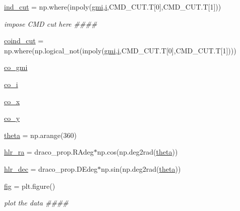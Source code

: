 \begin{DoxyCompactItemize}
\item 
\hyperlink{namespaceplot__Draco__SDSS__CMD__CMcut_af4ccb21831ab318676a2828b7225c1ca}{ind\+\_\+cut} = np.\+where(inpoly(\hyperlink{namespaceplot__Draco__SDSS__CMD__CMcut_a17ecc3c497056424be4f2c1d0fa8a178}{gmi},\hyperlink{namespaceplot__Draco__SDSS__CMD__CMcut_a6d4ac228accda712923ca1b9740c0407}{i},C\+M\+D\+\_\+\+C\+U\+T.\+T\mbox{[}0\mbox{]},C\+M\+D\+\_\+\+C\+U\+T.\+T\mbox{[}1\mbox{]}))
\begin{DoxyCompactList}\small\item\em impose C\+MD cut here \#\#\#\# \end{DoxyCompactList}\item 
\hyperlink{namespaceplot__Draco__SDSS__CMD__CMcut_a08f549437461f522191d2b4d0ea7659f}{coind\+\_\+cut} = np.\+where(np.\+logical\+\_\+not(inpoly(\hyperlink{namespaceplot__Draco__SDSS__CMD__CMcut_a17ecc3c497056424be4f2c1d0fa8a178}{gmi},\hyperlink{namespaceplot__Draco__SDSS__CMD__CMcut_a6d4ac228accda712923ca1b9740c0407}{i},C\+M\+D\+\_\+\+C\+U\+T.\+T\mbox{[}0\mbox{]},C\+M\+D\+\_\+\+C\+U\+T.\+T\mbox{[}1\mbox{]})))
\item 
\hyperlink{namespaceplot__Draco__SDSS__CMD__CMcut_a05465129dacea1fc4a6fedad4b0f0029}{co\+\_\+gmi}
\item 
\hyperlink{namespaceplot__Draco__SDSS__CMD__CMcut_a39d8d2ada3a2e98c5985f134fe54c6ec}{co\+\_\+i}
\item 
\hyperlink{namespaceplot__Draco__SDSS__CMD__CMcut_a4263c5309afa7bc424d494a8f68d69f7}{co\+\_\+x}
\item 
\hyperlink{namespaceplot__Draco__SDSS__CMD__CMcut_a65f19aa6538c710b3afe5b0fe1c4d5df}{co\+\_\+y}
\item 
\hyperlink{namespaceplot__Draco__SDSS__CMD__CMcut_a2e04bc162202f101d86aa8c604ec34c1}{theta} = np.\+arange(360)
\item 
\hyperlink{namespaceplot__Draco__SDSS__CMD__CMcut_a9b33fbee10f744052adb68e2f3bc584e}{hlr\+\_\+ra} = draco\+\_\+prop.\+R\+Adeg$\ast$np.\+cos(np.\+deg2rad(\hyperlink{namespaceplot__Draco__SDSS__CMD__CMcut_a2e04bc162202f101d86aa8c604ec34c1}{theta}))
\item 
\hyperlink{namespaceplot__Draco__SDSS__CMD__CMcut_a50f83d52fd6edd9aa111c67a52423089}{hlr\+\_\+dec} = draco\+\_\+prop.\+D\+Edeg$\ast$np.\+sin(np.\+deg2rad(\hyperlink{namespaceplot__Draco__SDSS__CMD__CMcut_a2e04bc162202f101d86aa8c604ec34c1}{theta}))
\item 
\hyperlink{namespaceplot__Draco__SDSS__CMD__CMcut_afa72503d8c4beee8a7d0855946ddc7a2}{fig} = plt.\+figure()
\begin{DoxyCompactList}\small\item\em plot the data \#\#\#\# \end{DoxyCompactList}\item 

\end{DoxyCompactItemize}
